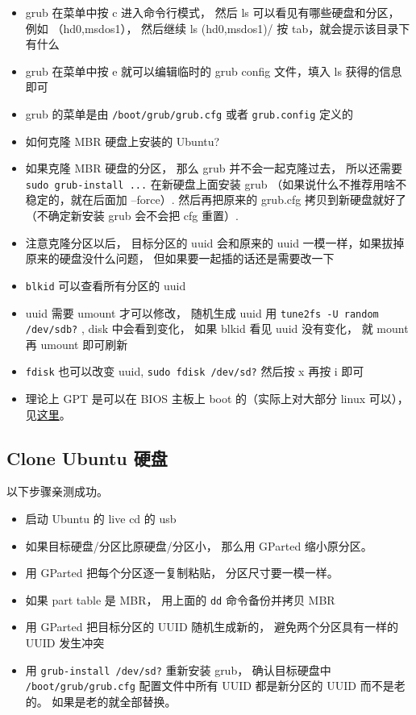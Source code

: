 \begin{itemize}
\item grub 在菜单中按 c 进入命令行模式， 然后 ls 可以看见有哪些硬盘和分区， 例如 （hd0,msdos1）， 然后继续 ls (hd0,msdos1)/ 按 tab，就会提示该目录下有什么
\item grub 在菜单中按 e 就可以编辑临时的 grub config 文件，填入 ls 获得的信息即可
\item grub 的菜单是由 \verb`/boot/grub/grub.cfg` 或者 \verb`grub.config` 定义的
\item 如何克隆 MBR 硬盘上安装的 Ubuntu?
\item 如果克隆 MBR 硬盘的分区， 那么 grub 并不会一起克隆过去， 所以还需要 \verb`sudo grub-install ...` 在新硬盘上面安装 grub （如果说什么不推荐用啥不稳定的，就在后面加 --force）. 然后再把原来的 grub.cfg 拷贝到新硬盘就好了（不确定新安装 grub 会不会把 cfg 重置）.
\item 注意克隆分区以后， 目标分区的 uuid 会和原来的 uuid 一模一样，如果拔掉原来的硬盘没什么问题， 但如果要一起插的话还是需要改一下
\item \verb`blkid` 可以查看所有分区的 uuid
\item uuid 需要 umount 才可以修改， 随机生成 uuid 用 \verb`tune2fs -U random /dev/sdb?` , disk 中会看到变化， 如果 blkid 看见 uuid 没有变化， 就 mount 再 umount 即可刷新
\item \verb`fdisk` 也可以改变 uuid, \verb`sudo fdisk /dev/sd?` 然后按 x 再按 i 即可
\item 理论上 GPT 是可以在 BIOS 主板上 boot 的（实际上对大部分 linux 可以）， 见\href{https://superuser.com/questions/1337344/is-it-possible-to-boot-linux-from-a-gpt-disk-on-a-bios-system}{这里}。
\end{itemize}

\subsection{Clone Ubuntu 硬盘}
以下步骤亲测成功。
\begin{itemize}
\item 启动 Ubuntu 的 live cd 的 usb
\item 如果目标硬盘/分区比原硬盘/分区小， 那么用 GParted 缩小原分区。
\item 用 GParted 把每个分区逐一复制粘贴， 分区尺寸要一模一样。
\item 如果 part table 是 MBR， 用上面的 \verb`dd` 命令备份并拷贝 MBR
\item 用 GParted 把目标分区的 UUID 随机生成新的， 避免两个分区具有一样的 UUID 发生冲突
\item 用 \verb`grub-install /dev/sd?` 重新安装 grub， 确认目标硬盘中 \verb`/boot/grub/grub.cfg` 配置文件中所有 UUID 都是新分区的 UUID 而不是老的。 如果是老的就全部替换。
\end{itemize}

